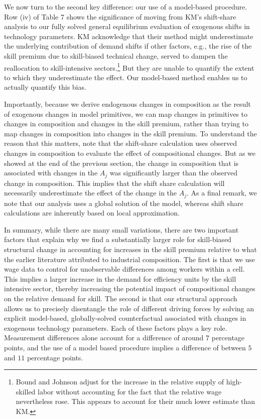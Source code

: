 \documentclass[12pt,english]{article}
\begin{document}
{\normalsize We now turn to the second key difference: our use of a
model-based procedure. Row (iv) of Table 7 shows the significance of moving
from KM's shift-share analysis to our fully solved general equilibrium
evaluation of exogenous shifts in technology parameters. KM acknowledge that
their method might underestimate the underlying contribution of demand
shifts if other factors, e.g., the rise of the skill premium due to
skill-biased technical change, served to dampen the reallocation to
skill-intensive sectors.\footnote{%
Bound and Johnson adjust for the increase in the relative supply of
high-skilled labor without accounting for the fact that the relative wage
nevertheless rose. This appears to account for their much lower estimate
than KM.} But they are unable to quantify the extent to which they
underestimate the effect. Our model-based method enables us to actually
quantify this bias. }

{\normalsize Importantly, because we derive endogenous changes in
composition as the result of exogenous changes in model primitives, we can
map changes in primitives to changes in composition and changes in the skill
premium, rather than trying to map changes in composition into changes in
the skill premium. To understand the reason that this matters, note that the
shift-share calculation uses observed changes in composition to evaluate the
effect of compositional changes. But as we showed at the end of the previous
section, the change in composition that is associated with changes in the $%
A_{j}$ was significantly larger than the observed change in composition.
This implies that the shift share calculation will necessarily underestimate
the effect of the change in the $A_{j}$. As a final remark, we note that our
analysis uses a global solution of the model, whereas shift share
calculations are inherently based on local approximation. }

{\normalsize In summary, while there are many small variations, there are
two important factors that explain why we find a substantially larger role
for skill-biased structural change in accounting for increases in the skill
premium relative to what the earlier literature attributed to industrial
composition. The first is that we use wage data to control for unobservable
differences among workers within a cell. This implies a larger increase in
the demand for efficiency units by the skill intensive sector, thereby
increasing the potential impact of compositional changes on the relative
demand for skill. The second is that our structural approach allows us to
precisely disentangle the role of different driving forces by solving an
explicit model-based, globally-solved counterfactual associated with changes
in exogenous technology parameters. Each of these factors plays a key role.
Measurement differences alone account for a difference of around $7$
percentage points, and the use of a model based procedure implies a
difference of between $5$ and $11$ percentage points. }
\end{document}
